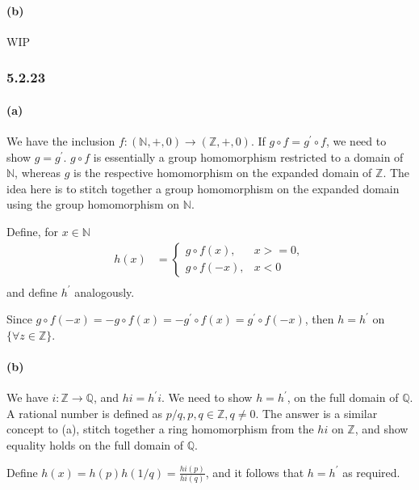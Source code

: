 \documentclass{article}
\begin{document}
\paragraph{(b)}

WIP

\subsubsection*{5.2.23}
\paragraph{(a)}

We have the inclusion $f: (\mathds{N},+,0) \rightarrow (\mathds{Z},+,0)$. If $g\circ f = g^\prime\circ f$, we need to show $g=g^\prime$. $g\circ f$ is essentially a group homomorphism restricted to a domain of $\mathds{N}$, whereas $g$ is the respective homomorphism on the expanded domain of $\mathds{Z}$. The idea here is to stitch together a group homomorphism on the expanded domain using the group homomorphism on $\mathds{N}$.

Define, for $x \in \mathds{N}$
\begin{align*}
  h(x) &= \begin{cases}
    g \circ f(x), &  x >=0,  \\
    g \circ f(-x), &  x < 0
  \end{cases} \\
\end{align*} and define $h^\prime$ analogously.

Since $g \circ f(-x) = -g \circ f (x) = -g^\prime \circ f (x) = g^\prime \circ f (-x)$, then $h=h^\prime$ on $\{\forall z \in \mathds{Z}\}$.

\paragraph{(b)}
We have $i: \mathds{Z} \rightarrow \mathds{Q}$, and $hi=h^\prime i$. We need to show $h=h^
\prime$, on the full domain of $\mathds{Q}$.
A rational number is defined as $p/q, p,q \in \mathds{Z}, q \neq 0$. The answer is a similar concept to (a), stitch together a ring homomorphism from the $hi$ on $\mathds{Z}$, and show equality holds on the full domain of $\mathds{Q}$.

Define $h(x) = h(p)h(1/q) = \frac{hi(p)}{hi(q)}$, and it follows that $h=h^\prime$ as required.
\end{document}
